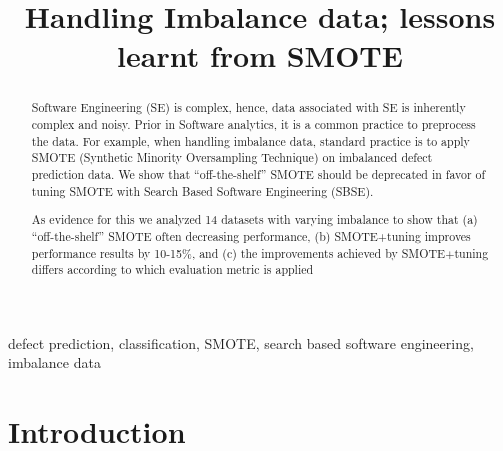 \documentclass[conference]{IEEEtran}
\begin{document}
\pagestyle{plain}

\title{Handling Imbalance data; lessons learnt from SMOTE}


\author{
\and
{}
}
\maketitle

\maketitle


\begin{abstract}
Software Engineering (SE) is complex, hence, data associated with SE is inherently complex and noisy. Prior in Software analytics, it is a common practice to preprocess the data. For example, when handling imbalance data, standard practice is to apply SMOTE (Synthetic Minority Oversampling Technique) on imbalanced defect prediction data. We show that ``off-the-shelf'' SMOTE should be deprecated in favor of tuning SMOTE with Search Based Software Engineering (SBSE). 

As evidence for this we analyzed 14 datasets with varying imbalance to show that (a) ``off-the-shelf'' SMOTE often decreasing performance, (b) SMOTE+tuning improves performance results by 10-15\%, and (c) the improvements achieved by SMOTE$+$tuning differs according to which evaluation metric is applied
\end{abstract}

\begin{IEEEkeywords}
defect prediction, classification, SMOTE, search based software engineering, imbalance data
\end{IEEEkeywords}


\IEEEpeerreviewmaketitle

\section{Introduction}
\end{document}
